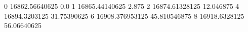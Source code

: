 0 16862.56640625 0.0
1 16865.44140625 2.875
2 16874.61328125 12.046875
4 16894.3203125 31.75390625
6 16908.376953125 45.810546875
8 16918.6328125 56.06640625
